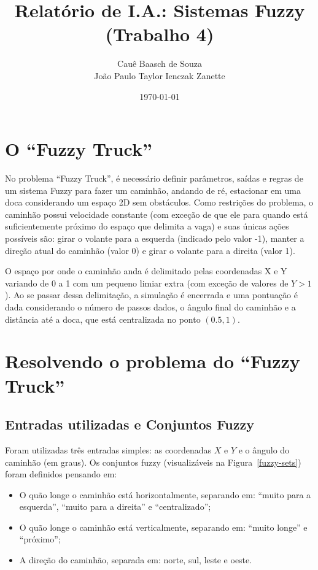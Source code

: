 \documentclass[twocolumn]{article}
\title{Relatório de I.A.: Sistemas Fuzzy (Trabalho 4)}
\author{Cauê Baasch de Souza \\
        João Paulo Taylor Ienczak Zanette}
\date{\today}
\begin{document}
    \maketitle{}

    \section{O ``Fuzzy Truck''}

    No problema ``Fuzzy Truck'', é necessário definir parâmetros, saídas e
    regras de um sistema Fuzzy para fazer um caminhão, andando de ré,
    estacionar em uma doca considerando um espaço 2D sem obstáculos. Como
    restrições do problema, o caminhão possui velocidade constante (com exceção
    de que ele para quando está suficientemente próximo do espaço que delimita
    a vaga) e suas únicas ações possíveis são: girar o volante para a esquerda
    (indicado pelo valor -1), manter a direção atual do caminhão (valor 0) e
    girar o volante para a direita (valor 1).

    O espaço por onde o caminhão anda é delimitado pelas coordenadas X e Y
    variando de 0 a 1 com um pequeno limiar extra (com exceção de valores de $Y
    > 1$). Ao se passar dessa delimitação, a simulação é encerrada e uma
    pontuação é dada considerando o número de passos dados, o ângulo final do
    caminhão e a distância até a doca, que está centralizada no ponto $(0.5,
    1)$.

    \section{Resolvendo o problema do ``Fuzzy Truck''}

    \subsection{Entradas utilizadas e Conjuntos Fuzzy}

    Foram utilizadas três entradas simples: as coordenadas $X$ e $Y$ e o ângulo
    do caminhão (em graus). Os conjuntos fuzzy (visualizáveis na
    Figura~\ref{fuzzy-sets}) foram definidos pensando em:

    \begin{itemize}
        \item O quão longe o caminhão está horizontalmente, separando em:
            ``muito para a esquerda'', ``muito para a direita'' e
            ``centralizado'';
        \item O quão longe o caminhão está verticalmente, separando em: ``muito
            longe'' e ``próximo'';
        \item A direção do caminhão, separada em: norte, sul, leste e oeste.
    \end{itemize}
\end{document}
